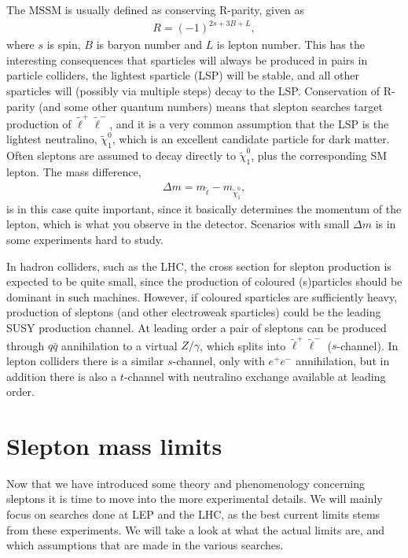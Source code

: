 \documentclass[twocolumn,a4paper,10pt]{article}
\begin{document}
The MSSM is usually defined as conserving R-parity, given as  
\begin{align*}
R = (-1)^{2s + 3B + L}, 
\end{align*}
where $s$ is spin, $B$ is baryon number and $L$ is lepton number. This has the 
interesting consequences that sparticles will always be produced in pairs in particle colliders, 
the lightest sparticle (LSP) will be stable, and all other sparticles will (possibly via multiple steps) 
decay to the LSP. Conservation of R-parity (and some other quantum numbers) means that slepton searches 
target production of $\tilde{\ell}^+\tilde{\ell}^-$, and it is a very common assumption that the LSP is 
the lightest neutralino, $\tilde{\chi}_1^0$, which is an excellent candidate particle for dark matter. 
Often sleptons are assumed to decay directly to $\tilde{\chi}_1^0$, plus the corresponding SM lepton. 
The mass difference, 
\begin{align}
\Delta m = m_{\tilde{\ell}} - m_{\tilde{\chi}^0_1}, 
\label{eq:delta m}
\end{align}  
is in this case quite important, since it basically determines the momentum of the lepton, which is 
what you observe in the detector. Scenarios with small $\Delta m$ is in some experiments hard to study. 

In hadron colliders, such as the LHC, the cross section for slepton production is expected to be 
quite small, since the production of coloured (s)particles should be dominant in such machines. 
However, if coloured sparticles are sufficiently heavy, production of sleptons (and other electroweak 
sparticles) could be the leading SUSY production channel. At leading order a pair of sleptons can be 
produced through $q\bar{q}$ annihilation to a virtual $Z/\gamma$, which splits into 
$\tilde{\ell}^+\tilde{\ell}^-$ ($s$-channel). In lepton colliders there is a similar $s$-channel, only 
with $e^+e^-$ annihilation, but in addition there is also a $t$-channel with neutralino exchange 
available at leading order.  

\section{Slepton mass limits}

Now that we have introduced some theory and phenomenology concerning sleptons it is time to move into 
the more experimental details. We will mainly focus on searches done at LEP and the LHC, as the best 
current limits stems from these experiments. We will take a look at what the actual limits are, and 
which assumptions that are made in the various searches.    
\end{document}

